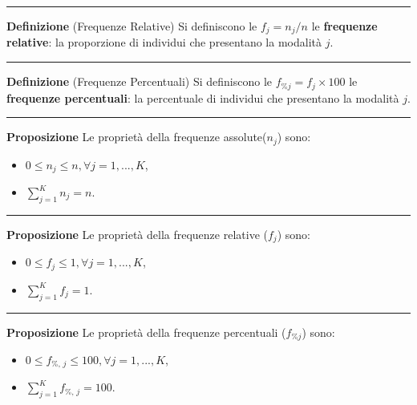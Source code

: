 \documentclass[
  11pt,
]{book}
\providecommand{\tightlist}{%
  \setlength{\itemsep}{0pt}\setlength{\parskip}{0pt}}
\theoremstyle{mytheoremstyle}
\theoremstyle{mydefstyle}
\begin{document}
\begin{center}\rule{0.5\linewidth}{0.5pt}\end{center}

\textbf{Definizione} (Frequenze Relative)
Si definiscono le \(f_j=n_j/n\) le \textbf{frequenze relative}: la proporzione di individui che presentano la modalità \(j\).

\begin{center}\rule{0.5\linewidth}{0.5pt}\end{center}

\textbf{Definizione} (Frequenze Percentuali)
Si definiscono le \(f_{\% j}=f_j\times 100\) le \textbf{frequenze percentuali}: la percentuale di individui che presentano la modalità \(j\).

\begin{center}\rule{0.5\linewidth}{0.5pt}\end{center}

\textbf{Proposizione}
Le proprietà della frequenze assolute(\(n_{j}\)) sono:

\begin{itemize}
\tightlist
\item
  \(0\leq n_{j} \leq n, \forall j=1,...,K\),
\item
  \(\sum_{j=1}^{K} n_{j} = n\).
\end{itemize}

\begin{center}\rule{0.5\linewidth}{0.5pt}\end{center}

\textbf{Proposizione}
Le proprietà della frequenze relative (\(f_{j}\)) sono:

\begin{itemize}
\tightlist
\item
  \(0\leq f_{j} \leq 1, \forall j=1,...,K\),
\item
  \(\sum_{j=1}^{K} f_{j} = 1\).
\end{itemize}

\begin{center}\rule{0.5\linewidth}{0.5pt}\end{center}

\textbf{Proposizione}
Le proprietà della frequenze percentuali (\(f_{\% j}\)) sono:

\begin{itemize}
\tightlist
\item
  \(0\leq f_{\%,\, j} \leq 100, \forall j=1,...,K\),
\item
  \(\sum_{j=1}^{K} f_{\%,\, j} = 100\).
\end{itemize}
\end{document}
